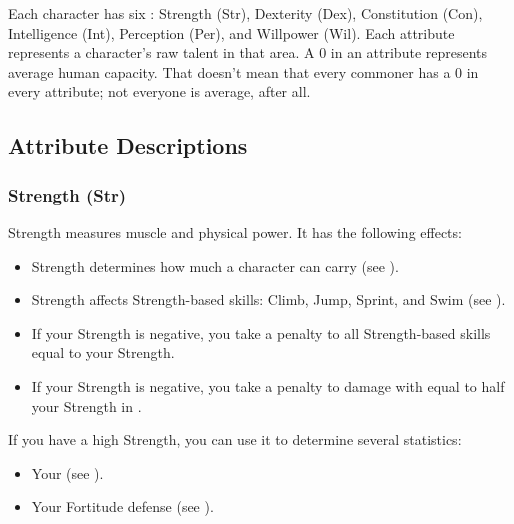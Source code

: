     Each character has six : Strength (Str), Dexterity (Dex), Constitution (Con), Intelligence (Int), Perception (Per), and Willpower (Wil).
    Each attribute represents a character's raw talent in that area.
    A 0 in an attribute represents average human capacity.
    That doesn't mean that every commoner has a 0 in every attribute; not everyone is average, after all.

    \subsection{Attribute Descriptions}

        \subsubsection{Strength (Str)}\label{Strength}
            Strength measures muscle and physical power.
            It has the following effects:
            \begin{itemize}
                \item Strength determines how much a character can carry (see ).
                \item Strength affects Strength-based skills: Climb, Jump, Sprint, and Swim (see ).
                \item If your Strength is negative, you take a penalty to all Strength-based skills equal to your Strength.
                \item If your Strength is negative, you take a penalty to damage with  equal to half your Strength in .
            \end{itemize}

            If you have a high Strength, you can use it to determine several statistics:
            \begin{itemize}
                \item Your  (see ).
                \item Your Fortitude defense (see ).
            \end{itemize}

